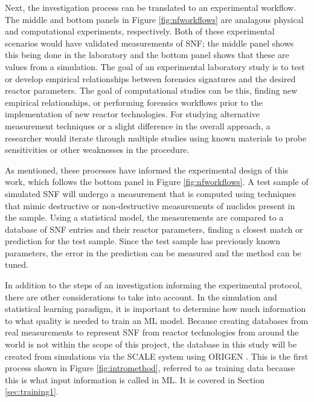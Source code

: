 Next, the investigation process can be translated to an experimental workflow.
The middle and bottom panels in Figure \ref{fig:nfworkflows} are analagous
physical and computational experiments, respectively.  Both of these
experimental scenarios would have validated measurements of \gls{SNF}; the
middle panel shows this being done in the laboratory and the bottom panel shows
that these are values from a simulation. The goal of an experimental laboratory
study is to test or develop empirical relationships between forensics
signatures and the desired reactor parameters. The goal of computational
studies can be this, finding new empirical relationships, or performing
forensics workflows prior to the implementation of new reactor technologies.
For studying alternative measurement techniques or a slight difference in the
overall approach, a researcher would iterate through multiple studies using
known materials to probe sensitivities or other weaknesses in the procedure.

As mentioned, these processes have informed the experimental design of this
work, which follows the bottom panel in Figure \ref{fig:nfworkflows}. A test
sample of simulated \gls{SNF} will undergo a measurement that is computed using
techniques that mimic destructive or non-destructive measurements of nuclides
present in the sample.  Using a statistical model, the measurements are
compared to a database of \gls{SNF} entries and their reactor parameters,
finding a closest match or prediction for the test sample. Since the test
sample has previously known parameters, the error in the prediction can be
measured and the method can be tuned. 

In addition to the steps of an investigation informing the experimental
protocol, there are other considerations to take into account. In the
simulation and statistical learning paradigm, it is important to determine how
much information to what quality is needed to train an \gls{ML} model. Because
creating databases from real measurements to represent \gls{SNF} from reactor
technologies from around the world is not within the scope of this project, the
database in this study will be created from simulations via the \gls{SCALE}
\cite{scale} system using \gls{ORIGEN} \cite{origen, origenarp}. This is the
first process shown in Figure \ref{fig:intromethod}, referred to as training
data because this is what input information is called in \gls{ML}. It is
covered in Section \ref{sec:training1}.

